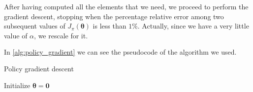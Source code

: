 After having computed all the elements that we need, we proceed to perform the gradient descent, stopping when the percentage relative error among two subsequent values of $J_\pi (\boldsymbol \theta)$ is less than $1\%$. Actually, since we have a very little value of $\alpha$, we rescale for it.

In \autoref{alg:policy_gradient} we can see the pseudocode of the algorithm we used.

\begin{algorithm}
    \DontPrintSemicolon
    \caption{Policy gradient descent}
    \label{alg:policy_gradient}
        Initialize $\boldsymbol \theta = \mathbf 0$\;
\end{algorithm}